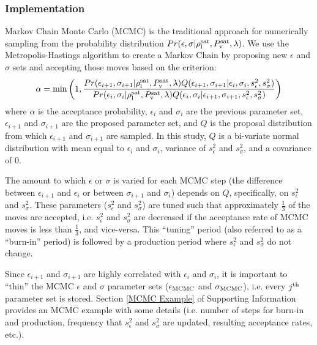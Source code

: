 \documentclass[preprint,letterpaper,floatfix,citeautoscript,aip,jcp]{revtex4-1}
\begin{document}
\subsubsection{Implementation}
Markov Chain Monte Carlo (MCMC) is the traditional approach for numerically sampling from the probability distribution $Pr(\epsilon,\sigma|\rho_{\rm l}^{\rm sat},P_{\rm v}^{\rm sat},\lambda)$. We use the Metropolis-Hastings algorithm to create a Markov Chain by proposing new $\epsilon$ and $\sigma$ sets and accepting those moves based on the criterion:
\begin{equation} \label{eq:Acceptance}
\alpha = \min\left(1,\frac{Pr(\epsilon_{i+1},\sigma_{i+1}|\rho_{\rm l}^{\rm sat},P_{\rm v}^{\rm sat},\lambda)Q(\epsilon_{i+1},\sigma_{i+1}|\epsilon_i,\sigma_i,s^2_\epsilon,s^2_\sigma)}{Pr(\epsilon_i,\sigma_i|\rho_{\rm l}^{\rm sat},P_{\rm v}^{\rm sat},\lambda)Q(\epsilon_i,\sigma_i|\epsilon_{i+1},\sigma_{i+1},s^2_\epsilon,s^2_\sigma)}\right)
\end{equation} 
where $\alpha$ is the acceptance probability, $\epsilon_i$ and $\sigma_i$ are the previous parameter set, $\epsilon_{i+1}$ and $\sigma_{i+1}$ are the proposed parameter set, and $Q$ is the proposal distribution from which $\epsilon_{i+1}$ and $\sigma_{i+1}$ are sampled. In this study, 
$Q$ is a bi-variate normal distribution with mean equal to $\epsilon_i$ and $\sigma_i$, variance of $s^2_\epsilon$ and $s^2_\sigma$, and a covariance of 0.

The amount to which $\epsilon$ or $\sigma$ is varied for each MCMC step (the difference between $\epsilon_{i+1}$ and $\epsilon_i$ or between $\sigma_{i+1}$ and $\sigma_i$) depends on $Q$, specifically, on $s^2_\epsilon$ and $s^2_\sigma$. These parameters ($s^2_\epsilon$ and $s^2_\sigma$) are tuned such that approximately $\frac{1}{3}$ of the moves are accepted, i.e. $s^2_\epsilon$ and $s^2_\sigma$ are decreased if the acceptance rate of MCMC moves is less than $\frac{1}{3}$, and vice-versa. This ``tuning'' period (also referred to as a ``burn-in'' period) is followed by a production period where $s^2_\epsilon$ and $s^2_\sigma$ do not change. 

Since $\epsilon_{i+1}$ and $\sigma_{i+1}$ are highly correlated with $\epsilon_i$ and $\sigma_i$, it is important to ``thin'' the MCMC $\epsilon$ and $\sigma$ parameter sets ($\epsilon_{\rm MCMC}$ and $\sigma_{\rm MCMC}$), i.e. every $j^{\rm th}$ parameter set is stored. Section \ref{MCMC Example} of Supporting Information provides an MCMC example with some details (i.e. number of steps for burn-in and production, frequency that $s^2_\epsilon$ and $s^2_\sigma$ are updated, resulting acceptance rates, etc.).
\end{document}
